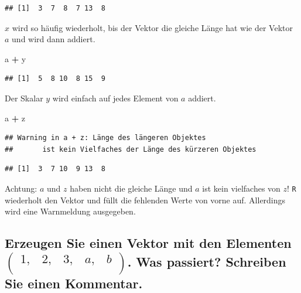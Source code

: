 \documentclass[12pt,a4paper]{article}
\newenvironment{Shaded}{\begin{snugshade}}{\end{snugshade}}
\newcommand{\NormalTok}[1]{#1}
\newcommand{\SpecialCharTok}[1]{\textcolor[rgb]{0.81,0.36,0.00}{\textbf{#1}}}
\begin{document}
\begin{verbatim}
## [1]  3  7  8  7 13  8
\end{verbatim}

\(x\) wird so häufig wiederholt, bis der Vektor die gleiche Länge hat
wie der Vektor \(a\) und wird dann addiert.

\begin{Shaded}
\begin{Highlighting}[]
\NormalTok{    a }\SpecialCharTok{+}\NormalTok{ y}
\end{Highlighting}
\end{Shaded}

\begin{verbatim}
## [1]  5  8 10  8 15  9
\end{verbatim}

Der Skalar \(y\) wird einfach auf jedes Element von \(a\) addiert.

\begin{Shaded}
\begin{Highlighting}[]
\NormalTok{    a }\SpecialCharTok{+}\NormalTok{ z}
\end{Highlighting}
\end{Shaded}

\begin{verbatim}
## Warning in a + z: Länge des längeren Objektes
##       ist kein Vielfaches der Länge des kürzeren Objektes
\end{verbatim}

\begin{verbatim}
## [1]  3  7 10  9 13  8
\end{verbatim}

Achtung: \(a\) und \(z\) haben nicht die gleiche Länge und \(a\) ist
kein vielfaches von \(z\)! \texttt{R} wiederholt den Vektor und füllt
die fehlenden Werte von vorne auf. Allerdings wird eine Warnmeldung
ausgegeben.

\vspace{0.5cm}

\hypertarget{erzeugen-sie-einen-vektor-mit-den-elementen-beginpmatrix-1-2-3-a-b-endpmatrix.-was-passiert-schreiben-sie-einen-kommentar.}{%
\subsection{\texorpdfstring{Erzeugen Sie einen Vektor mit den Elementen
\(\begin{pmatrix} 1, & 2, & 3, & a, & b \\ \end{pmatrix}\). Was
passiert? Schreiben Sie einen
Kommentar.}{Erzeugen Sie einen Vektor mit den Elementen \textbackslash begin\{pmatrix\} 1, \& 2, \& 3, \& a, \& b \textbackslash\textbackslash{} \textbackslash end\{pmatrix\}. Was passiert? Schreiben Sie einen Kommentar.}}\label{erzeugen-sie-einen-vektor-mit-den-elementen-beginpmatrix-1-2-3-a-b-endpmatrix.-was-passiert-schreiben-sie-einen-kommentar.}}
\end{document}
